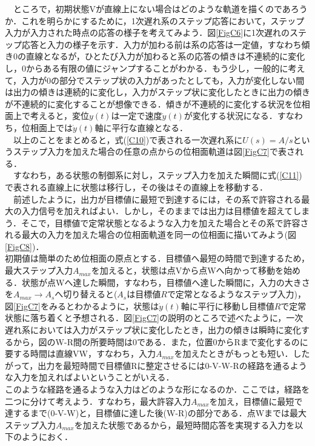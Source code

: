 \documentclass[12pt]{jsarticle}
\begin{document}
　ところで，初期状態Vが直線上にない場合はどのような軌道を描くのであろうか．これを明らかにするために，1次遅れ系のステップ応答において，ステップ入力が入力された時点の応答の様子を考えてみよう．図\ref{FigC6}に1次遅れのステップ応答と入力の様子を示す．入力が加わる前は系の応答は一定値，すなわち傾き0の直線となるが，ひとたび入力が加わると系の応答の傾きは不連続的に変化し，0からある有限の値にジャンプすることがわかる．もう少し，一般的に考えて，入力が0の部分でステップ状の入力があったとしても，入力が変化しない間は出力の傾きは連続的に変化し，入力がステップ状に変化したときに出力の傾きが不連続的に変化することが想像できる．傾きが不連続的に変化する状況を位相面上で考えると，変位$y(t)$は一定で速度$\dot{y}(t)$が変化する状況になる．すなわち，位相面上では$\dot{y}(t)$軸に平行な直線となる．\\
　以上のことをまとめると，式(\ref{C10})で表される一次遅れ系に$U(s)=A/s$というステップ入力を加えた場合の任意の点からの位相面軌道は図\ref{FigC7}で表される．\\
　すなわち，ある状態の制御系に対し，ステップ入力を加えた瞬間に式(\ref{C11})で表される直線上に状態は移行し，その後はその直線上を移動する．\\
　前述したように，出力が目標値に最短で到達するには，その系で許容される最大の入力信号を加えればよい．しかし，そのままでは出力は目標値を超えてしまう．そこで，目標値で定常状態となるような入力を加えた場合とその系で許容される最大の入力を加えた場合の位相面軌道を同一の位相面に描いてみよう(図\ref{FigC8})．\\
  初期値は簡単のため位相面の原点とする．目標値へ最短の時間で到達するため，最大ステップ入力$A_{max}$を加えると，状態は点Vから点Wへ向かって移動を始める．状態が点Wへ達した瞬間，すなわち，目標値へ達した瞬間に，入力の大きさを$A_{max}→ A_{s}$へ切り替えると($A_s$は目標値$R$で定常となるようなステップ入力)，図\ref{FigC7}をみるとわかるように，状態は$\dot{y}(t)$軸に平行に移動し目標値$R$で定常状態に落ち着くと予想される．図\ref{FigC7}の説明のところで述べたように，一次遅れ系においては入力がステップ状に変化したとき，出力の傾きは瞬時に変化するから，図のW-R間の所要時間は0である．また，位置0からRまで変化するのに要する時間は直線VW，すなわち，入力$A_{max}$を加えたときがもっとも短い．したがって，出力を最短時間で目標値Rに整定させるには0-V-W-Rの経路を通るような入力を加えればよいということがいえる．\\
  このような経路を通るような入力はどのような形になるのか．ここでは，経路を二つに分けて考えよう．すなわち，最大許容入力$A_{max}$を加え，目標値に最短で達するまで(0-V-W)と，目標値に達した後(W-R)の部分である．点Wまでは最大ステップ入力$A_{max}$を加えた状態であるから，最短時間応答を実現する入力を以下のようにおく．\\
\end{document}
